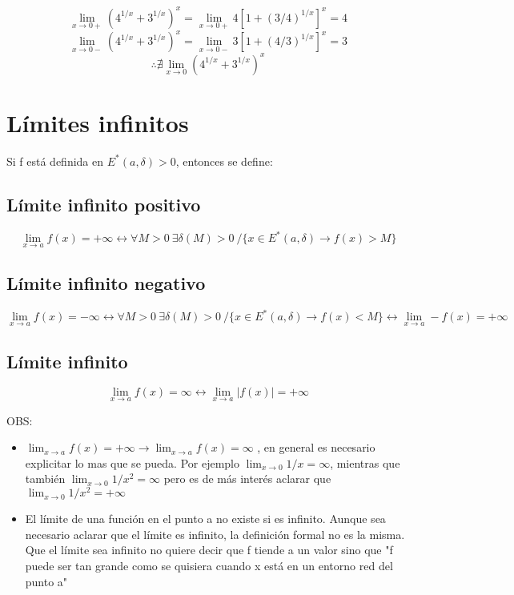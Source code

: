 \documentclass{report}
\begin{document}
		$$\lim_{x \to 0+}(4^{1/x}+3^{1/x})^x=\lim_{x \to 0+}4[1+(3/4)^{1/x}]^x=4$$
		$$\lim_{x \to 0-}(4^{1/x}+3^{1/x})^x=\lim_{x \to 0-}3[1+(4/3)^{1/x}]^x=3$$
		$$\therefore \nexists \lim_{x \to 0}(4^{1/x}+3^{1/x})^x$$
		
	\section{Límites infinitos}
		Si f está definida en $E^*(a,\delta)>0$, entonces se define:
		
		\subsection{Límite infinito positivo}
		$$\lim_{x \to a}f(x)=+\infty \leftrightarrow \forall M > 0 \ \exists \delta(M)>0 \ / \{x \in E^*(a,\delta) \rightarrow f(x) > M\}$$
		
		\subsection{Límite infinito negativo}
		$$\lim_{x \to a}f(x)=-\infty \leftrightarrow \forall M > 0 \ \exists \delta(M)>0 \ / \{x \in E^*(a,\delta) \rightarrow f(x) < M\} \leftrightarrow \lim_{x \to a}-f(x)=+\infty$$
		
		\subsection{Límite infinito}
		$$\lim_{x \to a}f(x)=\infty \leftrightarrow \lim_{x \to a}|f(x)|=+\infty$$
		
		OBS:
		
		\begin{itemize}
			\item $\lim_{x \to a}f(x)=+\infty \rightarrow \lim_{x \to a}f(x)=\infty$ , en general es necesario explicitar lo mas que se pueda. Por ejemplo $\lim_{x \to 0}1/x=\infty$, mientras que también $\lim_{x \to 0}1/x^2=\infty$ pero es de más interés aclarar que $\lim_{x \to 0}1/x^2=+\infty$
			
			\item El límite de una función en el punto a no existe si es infinito. Aunque sea necesario aclarar que el límite es infinito, la definición formal no es la misma. Que el límite sea infinito no quiere decir que f tiende a un valor sino que "f puede ser tan grande como se quisiera cuando x está en un entorno red del punto a"
			
		\end{itemize}
	
\end{document}

